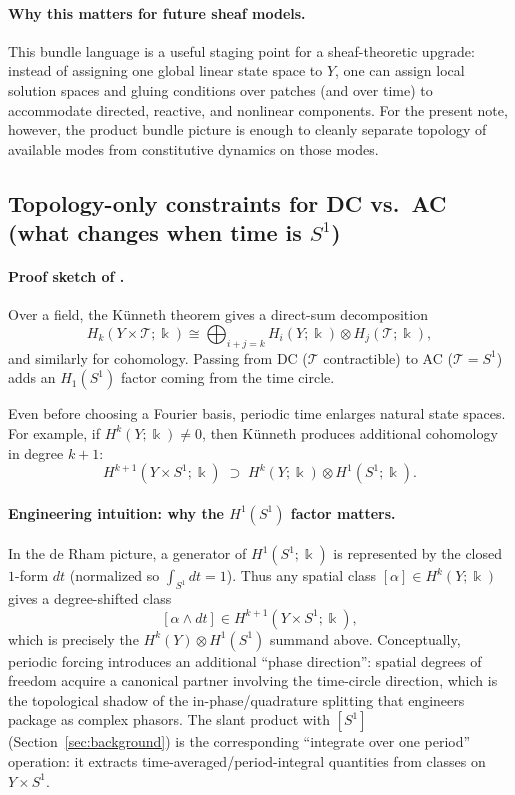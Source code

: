 \documentclass[11pt]{article}
\begin{document}
\paragraph{Why this matters for future sheaf models.}
This bundle language is a useful staging point for a sheaf-theoretic upgrade: instead of assigning one global linear state space to $Y$, one can assign local solution spaces and gluing conditions over patches (and over time) to accommodate directed, reactive, and nonlinear components.
For the present note, however, the product bundle picture is enough to cleanly separate topology of available modes from constitutive dynamics on those modes.

\subsection{\texorpdfstring{Topology-only constraints for DC vs.\ AC (what changes when time is $S^1$)}{Topology-only constraints for DC vs. AC (time circle)}}
\label{sec:dc-vs-ac-topology}
\paragraph{Proof sketch of .}
Over a field, the K\"unneth theorem gives a direct-sum decomposition
\[
H_k(Y\times \mathcal{T};\Bbbk)\cong \bigoplus_{i+j=k} H_i(Y;\Bbbk)\otimes H_j(\mathcal{T};\Bbbk),
\]
and similarly for cohomology.
Passing from DC ($\mathcal{T}$ contractible) to AC ($\mathcal{T}=S^1$) adds an $H_1(S^1)$ factor coming from the time circle.

Even before choosing a Fourier basis, periodic time enlarges natural state spaces.
For example, if $H^{k}(Y;\Bbbk)\neq 0$, then K\"unneth produces additional cohomology in degree $k+1$:
\[
H^{k+1}(Y\times S^1;\Bbbk)\;\supset\; H^{k}(Y;\Bbbk)\otimes H^{1}(S^1;\Bbbk).
\]

\paragraph{Engineering intuition: why the $H^1(S^1)$ factor matters.}
In the de Rham picture, a generator of $H^1(S^1;\Bbbk)$ is represented by the closed $1$-form $dt$ (normalized so $\int_{S^1} dt=1$).
Thus any spatial class $[\alpha]\in H^k(Y;\Bbbk)$ gives a degree-shifted class
\[
[\alpha\wedge dt]\in H^{k+1}(Y\times S^1;\Bbbk),
\]
which is precisely the $H^k(Y)\otimes H^1(S^1)$ summand above.
Conceptually, periodic forcing introduces an additional ``phase direction'': spatial degrees of freedom acquire a canonical partner involving the time-circle direction, which is the topological shadow of the in-phase/quadrature splitting that engineers package as complex phasors.
The slant product with $[S^1]$ (Section~\ref{sec:background}) is the corresponding ``integrate over one period'' operation: it extracts time-averaged/period-integral quantities from classes on $Y\times S^1$.
\end{document}
